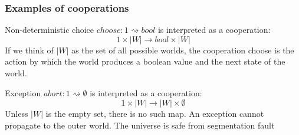 \documentclass{beamer}
\begin{document}
\begin{frame}
    \frametitle{Examples of cooperations}

    \begin{example}
        Non-deterministic choice $choose : 1 \rightsquigarrow bool$ is interpreted as a cooperation:
        \[
          1 \times |W| \rightarrow bool \times |W|  
        \]
        If we think of $|W |$
as the set of all possible worlds, the cooperation choose is the action by which the world
produces a boolean value and the next state of the world.
    \end{example}

\begin{example}
    Exception $abort : 1 \rightsquigarrow \emptyset$ is interpreted as a cooperation:
    \[
      1 \times |W| \rightarrow  |W| \times \emptyset  
    \]
    Unless $|W|$ is the empty set, there is no such map. An exception cannot propagate to the
outer world. The universe is safe from segmentation fault
\end{example}
\end{frame}
\end{document}
